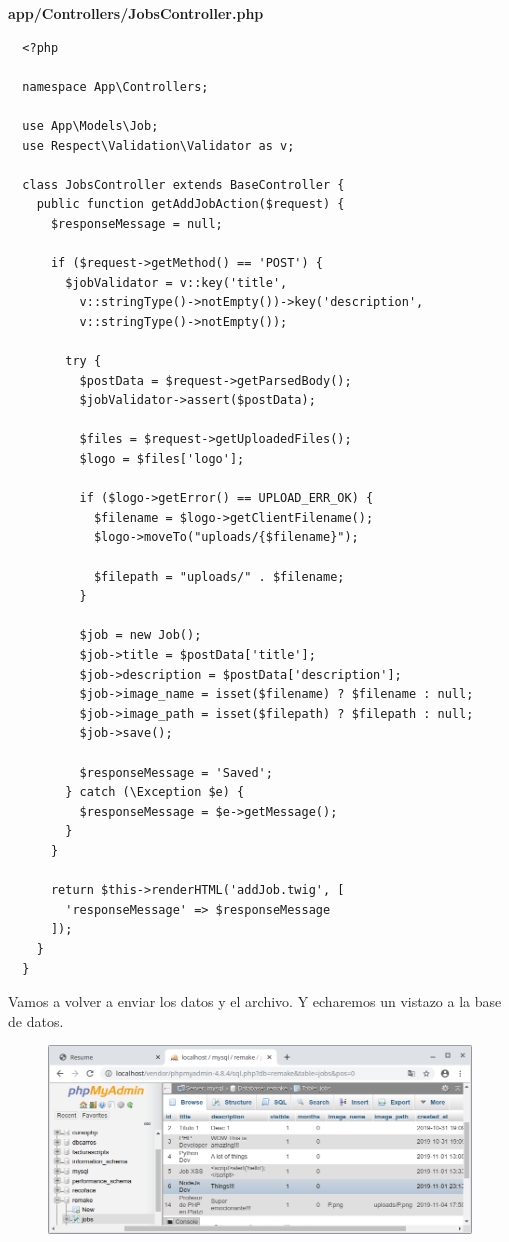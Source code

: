 \documentclass{article}
\begin{document}
\textbf{app/Controllers/JobsController.php}
\begin{verbatim}
  <?php

  namespace App\Controllers;

  use App\Models\Job;
  use Respect\Validation\Validator as v;

  class JobsController extends BaseController {
    public function getAddJobAction($request) {
      $responseMessage = null;

      if ($request->getMethod() == 'POST') {
        $jobValidator = v::key('title',
          v::stringType()->notEmpty())->key('description',
          v::stringType()->notEmpty());

        try {
          $postData = $request->getParsedBody();
          $jobValidator->assert($postData);

          $files = $request->getUploadedFiles();
          $logo = $files['logo'];

          if ($logo->getError() == UPLOAD_ERR_OK) {
            $filename = $logo->getClientFilename();
            $logo->moveTo("uploads/{$filename}");

            $filepath = "uploads/" . $filename;
          }

          $job = new Job();
          $job->title = $postData['title'];
          $job->description = $postData['description'];
          $job->image_name = isset($filename) ? $filename : null;
          $job->image_path = isset($filepath) ? $filepath : null;
          $job->save();

          $responseMessage = 'Saved';
        } catch (\Exception $e) {
          $responseMessage = $e->getMessage();
        }
      }

      return $this->renderHTML('addJob.twig', [
        'responseMessage' => $responseMessage
      ]);
    }
  }
\end{verbatim}

Vamos a volver a enviar los datos y el archivo. Y echaremos un vistazo a la
base de datos.

\begin{figure}[h!]
  \centering
  \includegraphics[scale=0.5]{./Pictures/186_bd_funcional.png}
\end{figure}
\end{document}

